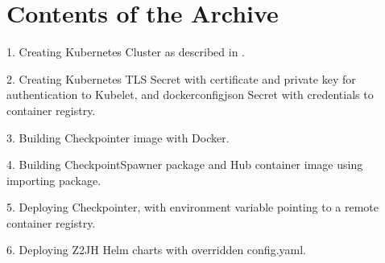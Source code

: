 \documentclass[
  digital,     %
  oneside,     %
  nosansbold,  %
  nocolorbold, %
  lof,         %
  nolot,         %
]{fithesis4}
\begin{document}
\printbibliography[heading=bibintoc] %



\appendix %
\chapter{Contents of the Archive}
\label{apendix}

1. Creating Kubernetes Cluster as described in .

2. Creating Kubernetes TLS Secret with certificate and private key for authentication to Kubelet, and dockerconfigjson Secret with credentials to container registry.

3. Building Checkpointer image with Docker.

4. Building CheckpointSpawner package and Hub container image using importing package.

5. Deploying Checkpointer, with environment variable pointing to a remote container registry.

6. Deploying Z2JH Helm charts with overridden config.yaml.
\end{document}
